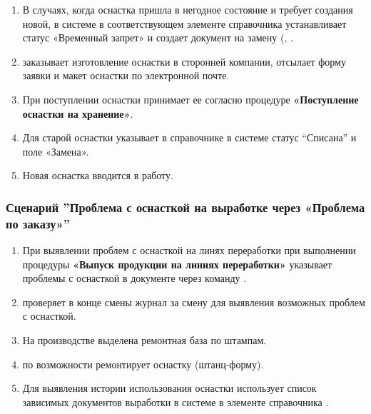 \begin{enumerate}
\item	В случаях, когда оснастка пришла в негодное состояние и требует создания новой, \tehnolog в системе \gofro в соответствующем элементе справочника  устанавливает статус «Временный запрет» и создает документ на замену (,  .
\item	\tehnolog заказывает изготовление оснастки в сторонней компании, отсылает форму заявки и макет оснастки по электронной почте.
\item	При поступлении оснастки \tehnolog принимает ее согласно процедуре \textbf{«Поступление оснастки на хранение»}.
\item	Для старой оснастки \tehnolog указывает в справочнике  в системе \gofro статус “Списана” и поле «Замена».
\item	Новая оснастка вводится в работу. %






\end{enumerate}



\subsubsection{Сценарий ''Проблема с оснасткой на выработке через «Проблема по заказу»''}
\label{bp:tool_4}

\begin{enumerate}
\item	При выявлении проблем с оснасткой на линях переработки при выполнении процедуры \textbf{«Выпуск продукции на линиях переработки»} \operator указывает проблемы с оснасткой в документе  через команду .
\item	\tehnolog проверяет в конце смены журнал  за смену для выявления возможных проблем с оснасткой.
\item На производстве выделена ремонтная база по штампам.

\item \operator по возможности ремонтирует оснастку (штанц-форму). 
\item	Для выявления истории использования оснастки \tehnolog использует список зависимых  документов выработки в системе \gofro в элементе  справочника .
\end{enumerate}